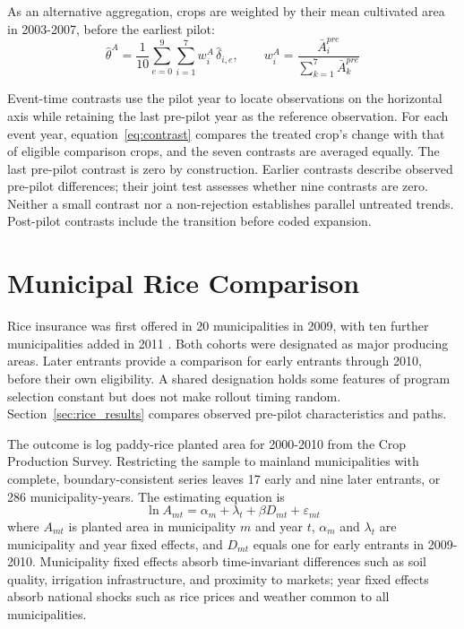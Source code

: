 As an alternative aggregation, crops are weighted by their mean cultivated area in 2003-2007, before the earliest pilot:
\begin{equation}\label{eq:areaweights}
\widehat{\theta}^{A} = \frac{1}{10}\sum_{e = 0}^{9}\sum_{i = 1}^{7}w_{i}^{A}\,\widehat{\delta}_{i,e},\qquad w_{i}^{A} = \frac{\bar{A}_{i}^{pre}}{\sum_{k = 1}^{7}\bar{A}_{k}^{pre}}
\end{equation}

Event-time contrasts use the pilot year to locate observations on the horizontal axis while retaining the last pre-pilot year as the reference observation. For each event year, equation~\eqref{eq:contrast} compares the treated crop's change with that of eligible comparison crops, and the seven contrasts are averaged equally. The last pre-pilot contrast is zero by construction. Earlier contrasts describe observed pre-pilot differences; their joint test assesses whether nine contrasts are zero. Neither a small contrast nor a non-rejection establishes parallel untreated trends. Post-pilot contrasts include the transition before coded expansion.

\section{Municipal Rice Comparison}\label{sec:rice_design}

Rice insurance was first offered in 20 municipalities in 2009, with ten further municipalities added in 2011 \citep{choi2010,mifaff2011}. Both cohorts were designated as major producing areas. Later entrants provide a comparison for early entrants through 2010, before their own eligibility. A shared designation holds some features of program selection constant but does not make rollout timing random. Section~\ref{sec:rice_results} compares observed pre-pilot characteristics and paths.

The outcome is log paddy-rice planted area for 2000-2010 from the Crop Production Survey. Restricting the sample to mainland municipalities with complete, boundary-consistent series leaves 17 early and nine later entrants, or 286 municipality-years. The estimating equation is
\begin{equation}\label{eq:rice}
\ln A_{mt} = \alpha_{m} + \lambda_{t} + \beta D_{mt} + \varepsilon_{mt}
\end{equation}
where $A_{mt}$ is planted area in municipality $m$ and year $t$, $\alpha_{m}$ and $\lambda_{t}$ are municipality and year fixed effects, and $D_{mt}$ equals one for early entrants in 2009-2010. Municipality fixed effects absorb time-invariant differences such as soil quality, irrigation infrastructure, and proximity to markets; year fixed effects absorb national shocks such as rice prices and weather common to all municipalities.

